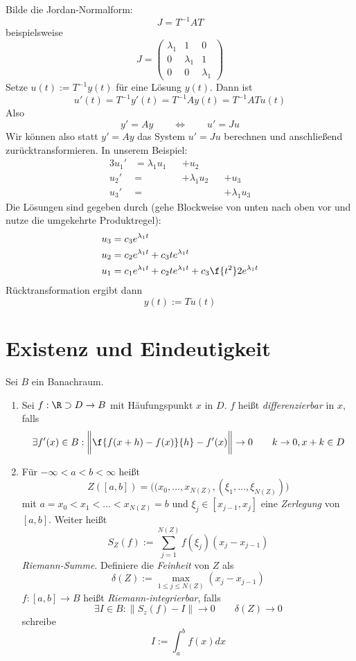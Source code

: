 \begin{seg}
	Bilde die Jordan-Normalform:
	\[
		J = T^{-1} A T
	\]
	beispielsweise
	\[
		J = \begin{pmatrix}
			\lambda_1 & 1 & 0\\
			0 & \lambda_1 & 1 \\
			0 & 0 & \lambda_1
		\end{pmatrix}
	\]
	Setze $u(t) := T^{-1} y(t)$ für eine Lösung $y(t)$.
	Dann ist
	\[
		u'(t) = T^{-1}y'(t) = T^{-1}Ay(t) = T^{-1}AT u(t)
	\]
	Also
	\[
		y' = Ay
		\qquad \iff \qquad
		u' = Ju
	\]
	Wir können also statt $y' = Ay$ das System $u' = Ju$ berechnen und anschließend zurücktransformieren.
	In unserem Beispiel:
	\begin{alignat*}{3}
		u_1' &= \lambda_1 u_1& &+ u_2 \\
		u_2' &= &&+ \lambda_1 u_2 && + u_3 \\
		u_3' &= && &&+\lambda_1 u_3
	\end{alignat*}
	Die Lösungen sind gegeben durch (gehe Blockweise von unten nach oben vor und nutze die umgekehrte Produktregel):
	\begin{align*}
		u_3 &= c_3 e^{\lambda_1 t} \\
		u_2 &= c_2 e^{\lambda_1 t} + c_3 t e^{\lambda_1 t} \\
		u_1 &= c_1 e^{\lambda_1 t} + c_2 t e^{\lambda_1 t} + c_3 \f {t^2}2 e^{\lambda_1 t} \\
	\end{align*}
	Rücktransformation ergibt dann
	\[
		y(t) := T u(t)
	\]
\end{seg}


\section{Existenz und Eindeutigkeit} %

\begin{df} \label{3.1}
	Sei $B$ ein Banachraum.
	\begin{enumerate}[1)]
		\item
			Sei $f: \R \supset D \to B$ mit Häufungspunkt $x$ in $D$.
			$f$ heißt \emph{differenzierbar} in $x$, falls
			\[
				\exists f'(x) \in B : \bigg\| \f{f(x+h)-f(x)}{h} - f'(x) \bigg\| \to 0
				\qquad k \to 0, x + k \in D
			\]
		\item
			Für $-\infty < a < b < \infty$ heißt
			\[
				Z([a,b]) = \Big( (x_0,\dotsc,x_{N(Z)}, (\xi_1, \dotsc, \xi_{N(Z)}) \Big)
			\]
			mit $a = x_0 < x_1 < \dotsc < x_{N(Z)} = b$ und $\xi_j \in [x_{j-1}, x_j]$ eine \emph{Zerlegung} von $[a,b]$.
			Weiter heißt
			\[
				S_Z(f) := \sum_{j=1}^{N(Z)} f(\xi_j)(x_j - x_{j-1})
			\]
			\emph{Riemann-Summe}.
			Definiere die \emph{Feinheit} von $Z$ als
			\[
				\delta(Z) := \max_{1\le j \le N(Z)} (x_j-x_{j-1})
			\]
			$f: [a,b] \to B$ heißt \emph{Riemann-integrierbar}, falls
			\[
				\exists I \in B : \|S_z(f) - I\| \to 0
				\qquad \delta(Z) \to 0
			\]
			schreibe
			\[
				I := \int_a^b f(x) dx
			\]
	\end{enumerate}
\end{df}

